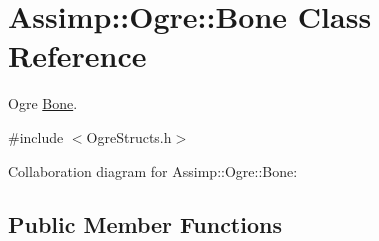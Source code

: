 \hypertarget{class_assimp_1_1_ogre_1_1_bone}{\section{Assimp\+:\+:Ogre\+:\+:Bone Class Reference}
\label{class_assimp_1_1_ogre_1_1_bone}
}


Ogre \hyperlink{class_assimp_1_1_ogre_1_1_bone}{Bone}.  




{\ttfamily \#include $<$Ogre\+Structs.\+h$>$}



Collaboration diagram for Assimp\+:\+:Ogre\+:\+:Bone\+:
\subsection*{Public Member Functions}
